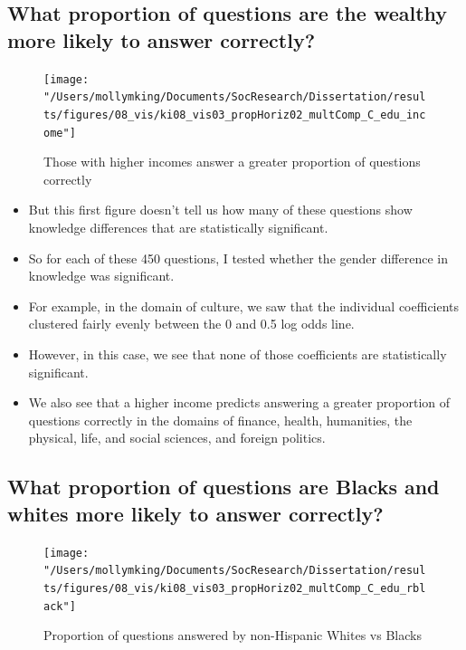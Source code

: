\documentclass[]{article}
\begin{document}
\newpage

\subsection{What proportion of questions are the wealthy more likely to answer correctly?}

\begin{figure}[ht]
    \begin{center}
      \texttt{[image: "/Users/mollymking/Documents/SocResearch/Dissertation/results/figures/08\_vis/ki08\_vis03\_propHoriz02\_multComp\_C\_edu\_income"]}
      \caption{Those with higher incomes answer a greater proportion of questions correctly}
    \end{center}
\end{figure}

\begin{itemize}
  \item{But this first figure doesn't tell us how many of these questions show knowledge differences that are statistically significant.}
  \item{So for each of these 450 questions, I tested whether the gender difference in knowledge was significant.}
  \item{For example, in the domain of culture, we saw that the individual coefficients clustered fairly evenly between the 0 and 0.5 log odds line.}
  \item{However, in this case, we see that none of those coefficients are statistically significant.}
  \vspace{5mm}
  \item{We also see that a higher income predicts answering a greater proportion of questions correctly in the domains of finance, health, humanities, the physical, life, and social sciences, and foreign politics.}
\end{itemize}

\newpage

\subsection{What proportion of questions are Blacks and whites more likely to answer correctly?}

\begin{figure}[ht]
    \begin{center}
      \texttt{[image: "/Users/mollymking/Documents/SocResearch/Dissertation/results/figures/08\_vis/ki08\_vis03\_propHoriz02\_multComp\_C\_edu\_rblack"]}
      \caption{Proportion of questions answered by non-Hispanic Whites vs Blacks}
    \end{center}
\end{figure}
\end{document}
